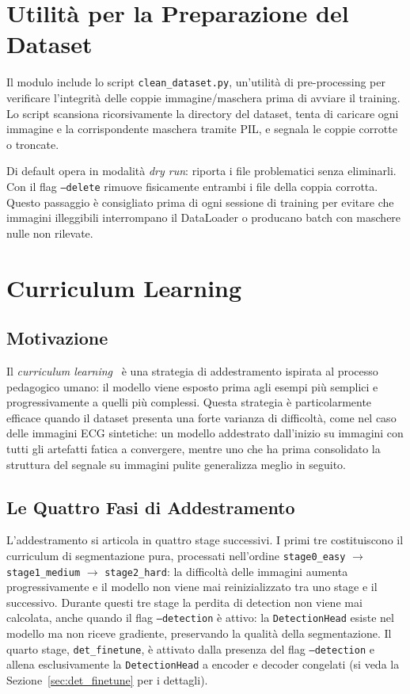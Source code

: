 \section{Utilità per la Preparazione del Dataset}

Il modulo include lo script \texttt{clean\_dataset.py}, un'utilità di pre-processing per verificare l'integrità delle coppie immagine/maschera prima di avviare il training. Lo script scansiona ricorsivamente la directory del dataset, tenta di caricare ogni immagine e la corrispondente maschera tramite PIL, e segnala le coppie corrotte o troncate.

Di default opera in modalità \textit{dry run}: riporta i file problematici senza eliminarli. Con il flag \texttt{--delete} rimuove fisicamente entrambi i file della coppia corrotta. Questo passaggio è consigliato prima di ogni sessione di training per evitare che immagini illeggibili interrompano il DataLoader o producano batch con maschere nulle non rilevate.

\section{Curriculum Learning}
\label{sec:curriculum}

\subsection{Motivazione}

Il \textit{curriculum learning}~\cite{10.1145/1553374.1553380} è una strategia di addestramento ispirata al processo pedagogico umano: il modello viene esposto prima agli esempi più semplici e progressivamente a quelli più complessi. Questa strategia è particolarmente efficace quando il dataset presenta una forte varianza di difficoltà, come nel caso delle immagini ECG sintetiche: un modello addestrato dall'inizio su immagini con tutti gli artefatti fatica a convergere, mentre uno che ha prima consolidato la struttura del segnale su immagini pulite generalizza meglio in seguito.

\subsection{Le Quattro Fasi di Addestramento}

L'addestramento si articola in quattro stage successivi. I primi tre costituiscono il curriculum di segmentazione pura, processati nell'ordine \texttt{stage0\_easy} $\to$ \texttt{stage1\_medium} $\to$ \texttt{stage2\_hard}: la difficoltà delle immagini aumenta progressivamente e il modello non viene mai reinizializzato tra uno stage e il successivo. Durante questi tre stage la perdita di detection non viene mai calcolata, anche quando il flag \texttt{--detection} è attivo: la \texttt{DetectionHead} esiste nel modello ma non riceve gradiente, preservando la qualità della segmentazione. Il quarto stage, \texttt{det\_finetune}, è attivato dalla presenza del flag \texttt{--detection} e allena esclusivamente la \texttt{DetectionHead} a encoder e decoder congelati (si veda la Sezione~\ref{sec:det_finetune} per i dettagli).




